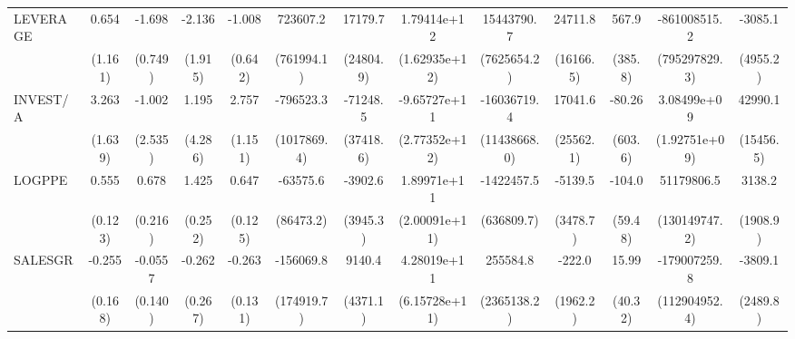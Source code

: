 \begin{table}[htbp]
\begin{tabular}{l*{12}{c}}
LEVERAGE            &       0.654         &      -1.698\sym{**} &      -2.136         &      -1.008         &    723607.2         &     17179.7         & 1.79414e+12         &  15443790.7\sym{*}  &     24711.8         &       567.9         &-861008515.2         &     -3085.1         \\
                    &     (1.161)         &     (0.749)         &     (1.915)         &     (0.642)         &  (761994.1)         &   (24804.9)         &(1.62935e+12)         & (7625654.2)         &   (16166.5)         &     (385.8)         &(795297829.3)         &    (4955.2)         \\
INVEST/A            &       3.263\sym{*}  &      -1.002         &       1.195         &       2.757\sym{**} &   -796523.3         &    -71248.5\sym{*}  &-9.65727e+11         & -16036719.4         &     17041.6         &      -80.26         & 3.08499e+09         &     42990.1\sym{**} \\
                    &     (1.639)         &     (2.535)         &     (4.286)         &     (1.151)         & (1017869.4)         &   (37418.6)         &(2.77352e+12)         &(11438668.0)         &   (25562.1)         &     (603.6)         &(1.92751e+09)         &   (15456.5)         \\
LOGPPE              &       0.555\sym{***}&       0.678\sym{***}&       1.425\sym{***}&       0.647\sym{***}&    -63575.6         &     -3902.6         & 1.89971e+11         &  -1422457.5\sym{**} &     -5139.5         &      -104.0         &  51179806.5         &      3138.2         \\
                    &     (0.123)         &     (0.216)         &     (0.252)         &     (0.125)         &   (86473.2)         &    (3945.3)         &(2.00091e+11)         &  (636809.7)         &    (3478.7)         &     (59.48)         &(130149747.2)         &    (1908.9)         \\
SALESGR             &      -0.255         &     -0.0557         &      -0.262         &      -0.263\sym{*}  &   -156069.8         &      9140.4\sym{*}  & 4.28019e+11         &    255584.8         &      -222.0         &       15.99         &-179007259.8         &     -3809.1         \\
                    &     (0.168)         &     (0.140)         &     (0.267)         &     (0.131)         &  (174919.7)         &    (4371.1)         &(6.15728e+11)         & (2365138.2)         &    (1962.2)         &     (40.32)         &(112904952.4)         &    (2489.8)         \\

\end{tabular}
\end{table}
